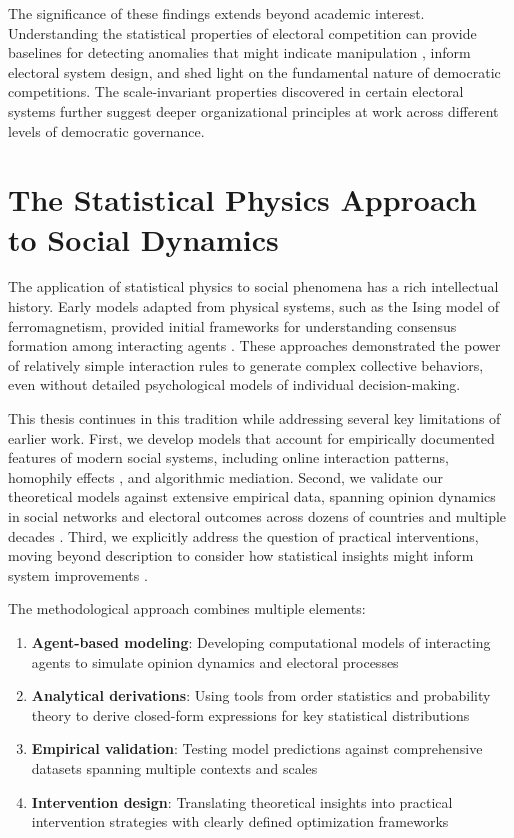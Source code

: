 The significance of these findings extends beyond academic interest. Understanding the statistical properties of electoral competition can provide baselines for detecting anomalies that might indicate manipulation \cite{statistical-detection-of-systematic-election-irregularities, testing-for-voter-rigging-in-small-polling-stations}, inform electoral system design, and shed light on the fundamental nature of democratic competitions. The scale-invariant properties discovered in certain electoral systems further suggest deeper organizational principles at work across different levels of democratic governance.

\section{The Statistical Physics Approach to Social Dynamics}

The application of statistical physics to social phenomena has a rich intellectual history. Early models adapted from physical systems, such as the Ising model of ferromagnetism, provided initial frameworks for understanding consensus formation among interacting agents \cite{galam2012sociophysics}. These approaches demonstrated the power of relatively simple interaction rules to generate complex collective behaviors, even without detailed psychological models of individual decision-making.

This thesis continues in this tradition while addressing several key limitations of earlier work. First, we develop models that account for empirically documented features of modern social systems, including online interaction patterns, homophily effects \cite{birds-of-a-feather-homophily-in-social-networks}, and algorithmic mediation. Second, we validate our theoretical models against extensive empirical data, spanning opinion dynamics in social networks and electoral outcomes across dozens of countries and multiple decades \cite{universal-statistics-of-competition, voter-turnouts-govern-key-electoral-statistics}. Third, we explicitly address the question of practical interventions, moving beyond description to consider how statistical insights might inform system improvements \cite{depolarization-of-echo-chambers-by-random-dynamical-nudge}.

The methodological approach combines multiple elements:

\begin{enumerate}
\item \textbf{Agent-based modeling}: Developing computational models of interacting agents to simulate opinion dynamics and electoral processes
\item \textbf{Analytical derivations}: Using tools from order statistics and probability theory to derive closed-form expressions for key statistical distributions
\item \textbf{Empirical validation}: Testing model predictions against comprehensive datasets spanning multiple contexts and scales
\item \textbf{Intervention design}: Translating theoretical insights into practical intervention strategies with clearly defined optimization frameworks
\end{enumerate}

